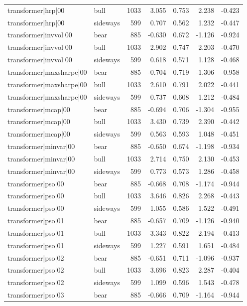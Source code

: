 \begin{table}
\begin{tabular}{llrrrrr}
transformer|hrp|00 & bull & 1033 & 3.055 & 0.753 & 2.238 & -0.423 \\
transformer|hrp|00 & sideways & 599 & 0.707 & 0.562 & 1.232 & -0.447 \\
transformer|invvol|00 & bear & 885 & -0.630 & 0.672 & -1.126 & -0.924 \\
transformer|invvol|00 & bull & 1033 & 2.902 & 0.747 & 2.203 & -0.470 \\
transformer|invvol|00 & sideways & 599 & 0.618 & 0.571 & 1.128 & -0.468 \\
transformer|maxsharpe|00 & bear & 885 & -0.704 & 0.719 & -1.306 & -0.958 \\
transformer|maxsharpe|00 & bull & 1033 & 2.610 & 0.791 & 2.022 & -0.441 \\
transformer|maxsharpe|00 & sideways & 599 & 0.737 & 0.608 & 1.212 & -0.484 \\
transformer|mcap|00 & bear & 885 & -0.694 & 0.706 & -1.304 & -0.955 \\
transformer|mcap|00 & bull & 1033 & 3.430 & 0.739 & 2.390 & -0.442 \\
transformer|mcap|00 & sideways & 599 & 0.563 & 0.593 & 1.048 & -0.451 \\
transformer|minvar|00 & bear & 885 & -0.650 & 0.674 & -1.198 & -0.934 \\
transformer|minvar|00 & bull & 1033 & 2.714 & 0.750 & 2.130 & -0.453 \\
transformer|minvar|00 & sideways & 599 & 0.773 & 0.573 & 1.286 & -0.458 \\
transformer|pso|00 & bear & 885 & -0.668 & 0.708 & -1.174 & -0.944 \\
transformer|pso|00 & bull & 1033 & 3.646 & 0.826 & 2.268 & -0.443 \\
transformer|pso|00 & sideways & 599 & 1.055 & 0.586 & 1.522 & -0.491 \\
transformer|pso|01 & bear & 885 & -0.657 & 0.709 & -1.126 & -0.940 \\
transformer|pso|01 & bull & 1033 & 3.343 & 0.822 & 2.194 & -0.413 \\
transformer|pso|01 & sideways & 599 & 1.227 & 0.591 & 1.651 & -0.484 \\
transformer|pso|02 & bear & 885 & -0.651 & 0.711 & -1.096 & -0.937 \\
transformer|pso|02 & bull & 1033 & 3.696 & 0.823 & 2.287 & -0.404 \\
transformer|pso|02 & sideways & 599 & 1.099 & 0.596 & 1.543 & -0.478 \\
transformer|pso|03 & bear & 885 & -0.666 & 0.709 & -1.164 & -0.944 \\

\end{tabular}
\end{table}
